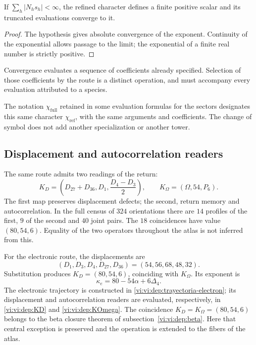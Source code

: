 \begin{proposition}
If \(\sum_h|N_hs_h|<\infty\), the refined character defines a finite
positive scalar and its truncated evaluations converge to it.
\end{proposition}
\begin{proof}
The hypothesis gives absolute convergence of the exponent. Continuity of the
exponential allows passage to the limit; the exponential of a finite real number is
strictly positive.
\end{proof}

Convergence evaluates a sequence of coefficients already specified.
Selection of those coefficients by the route is a distinct operation,
and must accompany every evaluation attributed to a species.

The notation \(\chi_{\mathrm{full}}\) retained in some evaluation
formulas for the sectors designates this same character
\(\chi_{\mathrm{ref}}\), with the same arguments and coefficients.
The change of symbol does not add another specialization or another tower.

\subsection{Displacement and autocorrelation readers}

The same route admits two readings of the return:
\[
 K_D=\left(D_{27}+D_{36},D_1,\frac{D_4-D_3}{2}\right),\qquad
 K_\Omega=(\Omega,54,P_6).
\]
The first map preserves displacement defects; the second, return
memory and autocorrelation. In the full census of \(324\) orientations
there are \(14\) profiles of the first, \(9\) of the second and \(40\) joint
pairs. The \(18\) coincidences have value \((80,54,6)\).
Equality of the two operators throughout the atlas is not inferred from this.

For the electronic route, the displacements are
\[
 (D_1,D_3,D_4,D_{27},D_{36})=(54,56,68,48,32).
\]
Substitution produces \(K_D=(80,54,6)\), coinciding with
\(K_\Omega\). Its exponent is
\[
 \kappa_e=80-54\alpha+6\Delta_4.
\]
The electronic trajectory is constructed in
\eqref{vi:vi:dep:trayectoria-electron}; its displacement and
autocorrelation readers are evaluated, respectively, in
\eqref{vi:vi:dep:KD} and \eqref{vi:vi:dep:KOmega}. The coincidence
\(K_D=K_\Omega=(80,54,6)\) belongs to the beta closure theorem of
subsection~\ref{vi:vi:dep:beta}. Here that central exception is preserved and the
operation is extended to the fibers of the atlas.

